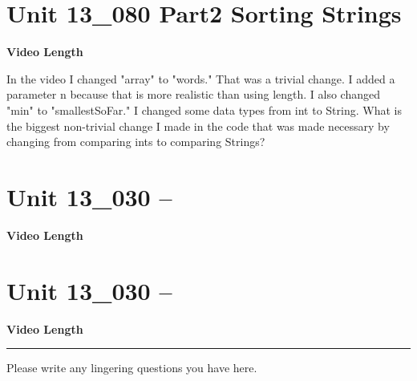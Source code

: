 \documentclass[letterpaper,12pt]{exam}
\newcommand{\unit}{Unit 13}
\begin{document}
\begin{questions}
\section*{\unit\_080 Part2 Sorting Strings } 
\par{\selectfont\textbf{Video Length }}
\begin{samepage}
    \question In the video I changed "array" to "words."  That was a trivial change.  I added a parameter n because that is more realistic than using length.  I also changed "min" to "smallestSoFar."  I changed some data types from int to String.  What is the biggest non-trivial change I made in the code that was made necessary by changing from comparing ints to comparing Strings?
    \vspace{5mm}
\end{samepage}

\section*{\unit\_030 -- } 
\par{\selectfont\textbf{Video Length }}

\section*{\unit\_030 -- } 
\par{\selectfont\textbf{Video Length }}




\begin{center}
    \rule{0.5\textwidth}{.4pt}
\end{center}
Please write any lingering questions you have here.
\end{questions}
\end{document}
